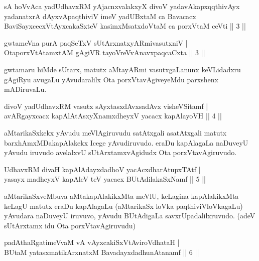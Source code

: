 \begin{shl}
sA hoVvAca yadUdhavxRM yAjacnxvalakxyX divoV yadavAkapxqqthivAyx yadanatxrA dAyxvApaqthiviV imeV yadUBxtaM ca Bavacacx BaviSayxcecxVtAyxcakaSxteV kasimxMsatxdoVtaM ca porxVtaM ceVti || 3 ||
\end{shl}

\begin{shl}
gwtameVna purA paqSeTxV sUtArxnatxyARmivasutxniV |\\
OtaporxVtAtamxtAM gAgiVR tayoVreVvAnavxpaqcaCxta \hfill || 3 ||
\end{shl}

\begin{artha}%
gwtamaru hiMde sUtarx, matutx aMtayARmi vasutxgaLanunx keVLidadxru gAgiRyu avugaLu yAvudaralilx Ota porxVtavAgiveyeMdu parxshenx mADiruvaLu.
\end{artha}


\begin{shl}
divoV yadUdhavxRM vasutx sAyxtasxdAvx\s sadAvx visheVSitamf |\\
avARgayxcacx kapAlAtAsxyXnamxdheyxV yacacx kapAlayoVH \hfill || 4 ||
\end{shl}

\begin{artha}
aMtarikaSxkekx yAvudu meVlAgiruvudu satAtxgali asatAtxgali matutx barxhAmxMDakapAlakekx Icege yAvudiruvudo. eraDu kapAlagaLa naDuveyU yAvudu iruvudo avelalxvU sUtArxtamxvAgidudx Ota porxVtavAgiruvudo.
\end{artha}


\begin{shl}
UdhavxRM divaH kapAlAdayxdadhoV yacAcxdharAtupxTAtf |\\
yasayx madheyxV kapAleV teV yacacx BUtAdilakaSxNamf \hfill || 5 ||
\end{shl}

\begin{artha}
aMtarikaSxveMbuva aMtakapAlakikxMta meVlU, keLagina kapAlakikxMta keLagU matutx eraDu kapAlagaLu (aMtarikaSx loVka paqthiviVloVkagaLu) yAvudara naDuveyU iruvuvo, yAvudu BUtAdigaLa savxrUpadalilxruvudo. (adeV sUtArxtamx idu Ota porxVtavAgiruvudu)
\end{artha}

\begin{shl}
padAthaRgatimeVvaM vA vAyxcakiSxVtAviroVdhataH |\\
BUtaM yatasxmatikArxnatxM BavadayxdadhunAtanamf \hfill || 6 ||
\end{shl}

